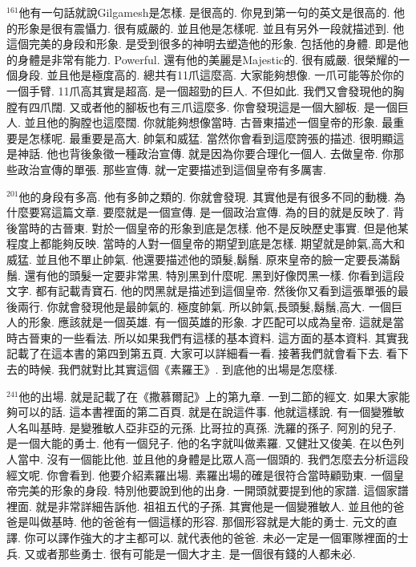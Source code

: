 \documentclass{book}
\begin{document}
$^{161}$他有一句話就說Gilgamesh是怎樣.
是很高的.
你見到第一句的英文是很高的.
他的形象是很有震懾力.
很有威嚴的.
並且他是怎樣呢.
並且有另外一段就描述到.
他這個完美的身段和形象.
是受到很多的神明去塑造他的形象.
包括他的身體.
即是他的身體是非常有能力.
Powerful.
還有他的美麗是Majestic的.
很有威嚴.
很榮耀的一個身段.
並且他是極度高的.
總共有11爪這麼高.
大家能夠想像.
一爪可能等於你的一個手臂.
11爪高其實是超高.
是一個超勁的巨人.
不但如此.
我們又會發現他的胸膛有四爪闊.
又或者他的腳板也有三爪這麼多.
你會發現這是一個大腳板.
是一個巨人.
並且他的胸膛也這麼闊.
你就能夠想像當時.
古晉東描述一個皇帝的形象.
最重要是怎樣呢.
最重要是高大.
帥氣和威猛.
當然你會看到這麼誇張的描述.
很明顯這是神話.
他也背後象徵一種政治宣傳.
就是因為你要合理化一個人.
去做皇帝.
你那些政治宣傳的單張.
那些宣傳.
就一定要描述到這個皇帝有多厲害.

$^{201}$他的身段有多高.
他有多帥之類的.
你就會發現.
其實他是有很多不同的動機.
為什麼要寫這篇文章.
要麼就是一個宣傳.
是一個政治宣傳.
為的目的就是反映了.
背後當時的古晉東.
對於一個皇帝的形象到底是怎樣.
他不是反映歷史事實.
但是他某程度上都能夠反映.
當時的人對一個皇帝的期望到底是怎樣.
期望就是帥氣,高大和威猛.
並且他不單止帥氣.
他還要描述他的頭髮,鬍鬚.
原來皇帝的臉一定要長滿鬍鬚.
還有他的頭髮一定要非常黑.
特別黑到什麼呢.
黑到好像閃黑一樣.
你看到這段文字.
都有記載青寶石.
他的閃黑就是描述到這個皇帝.
然後你又看到這張單張的最後兩行.
你就會發現他是最帥氣的.
極度帥氣.
所以帥氣,長頭髮,鬍鬚,高大.
一個巨人的形象.
應該就是一個英雄.
有一個英雄的形象.
才匹配可以成為皇帝.
這就是當時古晉東的一些看法.
所以如果我們有這樣的基本資料.
這方面的基本資料.
其實我記載了在這本書的第四到第五頁.
大家可以詳細看一看.
接著我們就會看下去.
看下去的時候.
我們就對比其實這個《素羅王》.
到底他的出場是怎麼樣.

$^{241}$他的出場.
就是記載了在《撒慕爾記》上的第九章.
一到二節的經文.
如果大家能夠可以的話.
這本書裡面的第二百頁.
就是在說這件事.
他就這樣說.
有一個變雅敏人名叫基時.
是變雅敏人亞非亞的元孫.
比哥拉的真孫.
洗羅的孫子.
阿別的兒子.
是一個大能的勇士.
他有一個兒子.
他的名字就叫做素羅.
又健壯又俊美.
在以色列人當中.
沒有一個能比他.
並且他的身體是比眾人高一個頭的.
我們怎麼去分析這段經文呢.
你會看到.
他要介紹素羅出場.
素羅出場的確是很符合當時顧勁東.
一個皇帝完美的形象的身段.
特別他要說到他的出身.
一開頭就要提到他的家譜.
這個家譜裡面.
就是非常詳細告訴他.
祖祖五代的子孫.
其實他是一個變雅敏人.
並且他的爸爸是叫做基時.
他的爸爸有一個這樣的形容.
那個形容就是大能的勇士.
元文的直譯.
你可以譯作強大的才主都可以.
就代表他的爸爸.
未必一定是一個軍隊裡面的士兵.
又或者那些勇士.
很有可能是一個大才主.
是一個很有錢的人都未必.
\end{document}
